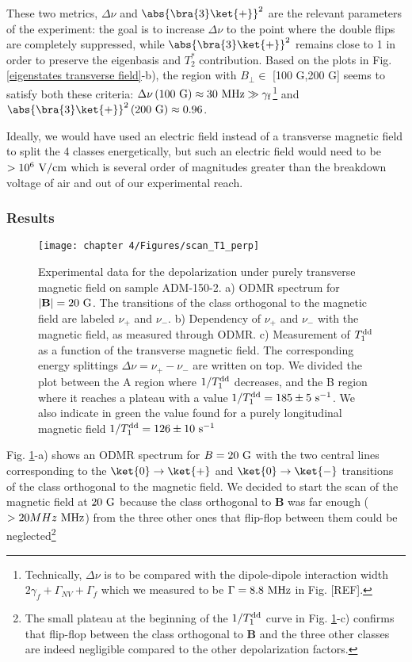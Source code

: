 \documentclass[a4paper, 11pt]{book}
\begin{document}
These two metrics, $\Delta \nu$ and $\abs{\bra{3}\ket{+}}^2$ are the relevant parameters of the experiment: the goal is to increase $\Delta \nu$ to the point where the double flips are completely suppressed, while $\abs{\bra{3}\ket{+}}^2$ remains close to 1 in order to preserve the eigenbasis and $T_2^*$ contribution. Based on the plots in Fig.\ref{eigenstates transverse field}-b), the region with $B_\perp \in$ [100 G,200 G] seems to satisfy both these criteria: $\Delta \nu\,(100\ \rm G) \approx 30\ \rm MHz \gg \gamma_f$\footnote{Technically, $\Delta \nu$ is to be compared with the dipole-dipole interaction width $2\gamma_f+\Gamma_{NV}+\Gamma_f$ which we measured to be $\Gamma=8.8\ \rm MHz$ in Fig. [REF].} and $\abs{\bra{3}\ket{+}}^2\, (200\ \rm G) \approx 0.96$.

Ideally, we would have used an electric field instead of a transverse magnetic field to split the 4 classes energetically, but such an electric field would need to be $> 10^6\ \rm{V/cm}$ which is several order of magnitudes greater than the breakdown voltage of air and out of our experimental reach.

\subsubsection{Results}

\begin{figure}[h!]
\centering
\texttt{[image: chapter 4/Figures/scan\_T1\_perp]}
\caption{Experimental data for the depolarization under purely transverse magnetic field on sample ADM-150-2. a) ODMR spectrum for $|\mathbf{B}|=20\ \rm G$. The transitions of the class orthogonal to the magnetic field are labeled $\nu_+$ and $\nu_-$. b) Dependency of $\nu_+$ and $\nu_-$ with the magnetic field, as measured through ODMR. c) Measurement of $T_1^{\rm dd}$ as a function of the transverse magnetic field. The corresponding energy splittings $\Delta \nu=\nu_+-\nu_-$ are written on top. We divided the plot between the A region where $1/T_1^{\rm dd}$ decreases, and the B region where it reaches a plateau with a value $1/T_1^{\rm dd}=185 \pm 5\ \rm s^{-1}$. We also indicate in green the value found for a purely longitudinal magnetic field $1/T_1^{\rm dd}=126 \pm 10\ \rm s^{-1}$}
\label{champ tranverse exp}
\end{figure}

Fig. \ref{champ tranverse exp}-a) shows an ODMR spectrum for $B=20\ \rm G$ with the two central lines corresponding to the $\ket{0} \to \ket{+}$ and $\ket{0} \to \ket{-}$ transitions of the class orthogonal to the magnetic field. We decided to start the scan of the magnetic field at $20\ \rm G$ because the class orthogonal to $\mathbf{B}$ was far enough ($> 20 MHz\ \rm MHz$) from the three other ones that flip-flop between them could be neglected\footnote{The small plateau at the beginning of the $1/T_1^{\rm dd}$ curve in Fig. \ref{champ tranverse exp}-c) confirms that flip-flop between the class orthogonal to $\mathbf{B}$ and the three other classes are indeed negligible compared to the other depolarization factors.}
\end{document}
